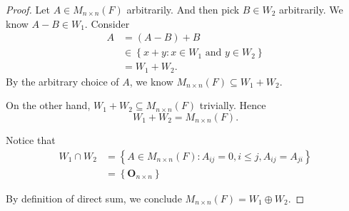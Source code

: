 \begin{Exercise}
\begin{proof}
Let $A\in M_{n\times n}(F)$ arbitrarily. And then pick $B\in W_2$ arbitrarily. We know $A-B\in W_1$. Consider
\begin{align*}
A 
&= (A-B) + B \\
&\in \left\{ x+y:x\in W_1\text{ and }y\in W_2 \right\} \\
&= W_1+W_2.
\end{align*}
By the arbitrary choice of $A$, we know $M_{n\times n}(F)\subseteq W_1+W_2$.

On the other hand, $W_1+W_2\subseteq M_{n\times n}(F)$ trivially. Hence 
$$
W_1+W_2 = M_{n\times n}(F).
$$

Notice that
\begin{align*}
W_1\cap W_2
&= \left\{ A\in M_{n\times n}(F):A_{i j}=0, i\leq j, A_{i j} = A_{j i} \right\} \\
&= \left\{ \mathbf{O}_{n\times n} \right\}
\end{align*}

By definition of direct sum, we conclude $M_{n\times n}(F) = W_1\oplus W_2$.
\end{proof}
\end{Exercise}